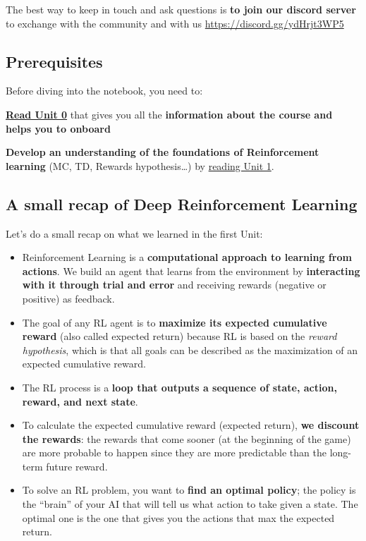 \documentclass[11pt,a4paper]{article}
\begin{document}
The best way to keep in touch and ask questions is \textbf{to join our discord server} to exchange with the community and with us \url{https://discord.gg/ydHrjt3WP5}

\subsection{Prerequisites}\label{prerequisites}

Before diving into the notebook, you need to:

\textbf{\href{https://huggingface.co/deep-rl-course/unit0/introduction}{Read Unit 0}} that gives you all the \textbf{information about the course and helps you to onboard}

\textbf{Develop an understanding of the foundations of Reinforcement learning} (MC, TD, Rewards hypothesis\ldots) by \href{https://huggingface.co/deep-rl-course/unit1/introduction}{reading Unit 1}.

\subsection{A small recap of Deep Reinforcement Learning}\label{a-small-recap-of-deep-reinforcement-learning}


Let's do a small recap on what we learned in the first Unit:

\begin{itemize}
\item
  Reinforcement Learning is a \textbf{computational approach to learning from actions}. We build an agent that learns from the environment by \textbf{interacting with it through trial and error} and receiving rewards (negative or positive) as feedback.
\item
  The goal of any RL agent is to \textbf{maximize its expected cumulative reward} (also called expected return) because RL is based on the \emph{reward hypothesis}, which is that all goals can be described as the maximization of an expected cumulative reward.
\item
  The RL process is a \textbf{loop that outputs a sequence of state, action, reward, and next state}.
\item
  To calculate the expected cumulative reward (expected return), \textbf{we discount the rewards}: the rewards that come sooner (at the beginning of the game) are more probable to happen since they are more predictable than the long-term future reward.
\item
  To solve an RL problem, you want to \textbf{find an optimal policy}; the policy is the ``brain'' of your AI that will tell us what action to take given a state. The optimal one is the one that gives you the actions that max the expected return.
\end{itemize}
\end{document}
